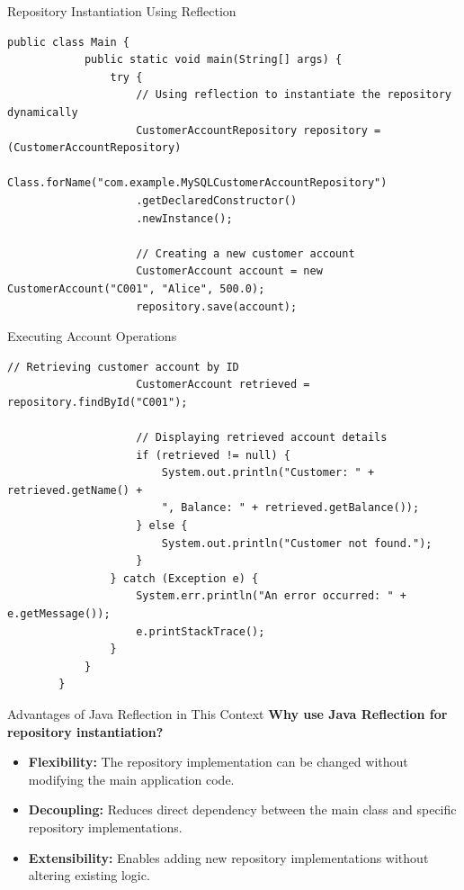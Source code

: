 \documentclass[aspectratio=169, table]{beamer}
\begin{document}
\begin{frame}[fragile]{Repository Instantiation Using Reflection}
	\vspace{20pt}
	\begin{lstlisting}[style=JavaStyle]
		public class Main {
			public static void main(String[] args) {
				try {
					// Using reflection to instantiate the repository dynamically
					CustomerAccountRepository repository = (CustomerAccountRepository)
					Class.forName("com.example.MySQLCustomerAccountRepository")
					.getDeclaredConstructor()
					.newInstance();
					
					// Creating a new customer account
					CustomerAccount account = new CustomerAccount("C001", "Alice", 500.0);
					repository.save(account);
				\end{lstlisting}
			\end{frame}
			
			\begin{frame}[fragile]{Executing Account Operations}
				\vspace{20pt}
				\begin{lstlisting}[style=JavaStyle]
					// Retrieving customer account by ID
					CustomerAccount retrieved = repository.findById("C001");
					
					// Displaying retrieved account details
					if (retrieved != null) {
						System.out.println("Customer: " + retrieved.getName() + 
						", Balance: " + retrieved.getBalance());
					} else {
						System.out.println("Customer not found.");
					}
				} catch (Exception e) {
					System.err.println("An error occurred: " + e.getMessage());
					e.printStackTrace();
				}
			}
		}
	\end{lstlisting}
\end{frame}



\begin{frame}[fragile]{Advantages of Java Reflection in This Context}
	\vspace{20pt}
	\textbf{Why use Java Reflection for repository instantiation?}
	\begin{itemize}
		\item \textbf{Flexibility:} The repository implementation can be changed without modifying the main application code.
		\item \textbf{Decoupling:} Reduces direct dependency between the main class and specific repository implementations.
		\item \textbf{Extensibility:} Enables adding new repository implementations without altering existing logic.
	\end{itemize}
\end{frame}
\end{document}
